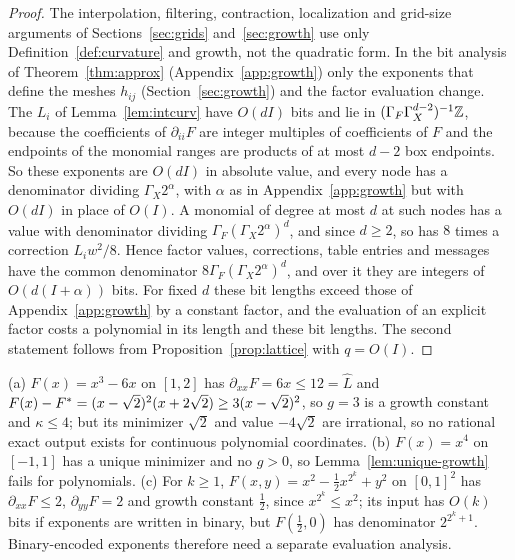 \begin{proof}
The interpolation, filtering, contraction, localization and grid-size
arguments of Sections~\ref{sec:grids} and~\ref{sec:growth} use only
Definition~\ref{def:curvature} and growth, not the quadratic form. In the bit
analysis of Theorem~\ref{thm:approx} (Appendix~\ref{app:growth}) only the
exponents that define the meshes $h_{ij}$ (Section~\ref{sec:growth}) and the
factor evaluation change. The $L_i$ of Lemma~\ref{lem:intcurv} have $O(dI)$
bits and lie in $(\Gamma_F\Gamma_X^{d-2})^{-1}\mathbb Z$, because the coefficients
of $\partial_{ii}F$ are integer multiples of coefficients of $F$ and the
endpoints of the monomial ranges are products of at most $d-2$ box endpoints.
So these exponents are $O(dI)$ in absolute value, and every node has a
denominator dividing $\Gamma_X2^\alpha$, with $\alpha$ as in
Appendix~\ref{app:growth} but with $O(dI)$ in place of $O(I)$. A monomial
of degree at most $d$ at such nodes has a value with denominator dividing
$\Gamma_F(\Gamma_X2^\alpha)^d$, and since $d\ge2$, so has $8$ times a
correction $L_iw^2/8$. Hence factor values, corrections, table entries and
messages have the common denominator $8\Gamma_F(\Gamma_X2^\alpha)^d$, and
over it they are integers of $O(d(I+\alpha))$ bits. For fixed $d$ these bit lengths exceed those of
Appendix~\ref{app:growth} by a constant factor, and the evaluation of an
explicit factor costs a polynomial in its length and these bit lengths. The
second statement follows from Proposition~\ref{prop:lattice} with $q=O(I)$.
\end{proof}

\begin{example}\label{ex:polylimits}
(a) $F(x)=x^3-6x$ on $[1,2]$ has $\partial_{xx}F=6x\le12=\hat L$ and
$F(x)-F^{*}=(x-\sqrt2)^2(x+2\sqrt2)\ge3(x-\sqrt2)^2$, so $g=3$ is a growth
constant and $\kappa\le4$; but its minimizer $\sqrt2$ and value $-4\sqrt2$
are irrational, so no rational exact output exists for continuous polynomial
coordinates. (b) $F(x)=x^4$ on $[-1,1]$ has a unique minimizer and no
$g>0$, so Lemma~\ref{lem:unique-growth} fails for polynomials.
(c) For $k\ge1$, $F(x,y)=x^2-\frac12x^{2^k}+y^2$ on $[0,1]^2$ has
$\partial_{xx}F\le2$, $\partial_{yy}F=2$ and growth constant $\frac12$, since
$x^{2^k}\le x^2$; its input has $O(k)$ bits if exponents are written in
binary, but $F(\frac12,0)$ has denominator $2^{2^k+1}$. Binary-encoded
exponents therefore need a separate evaluation analysis.
\end{example}

